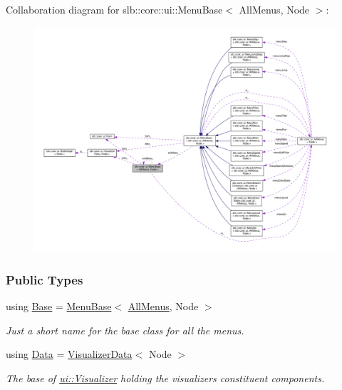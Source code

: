 Collaboration diagram for slb\+:\+:core\+:\+:ui\+:\+:Menu\+Base$<$ All\+Menus, Node $>$\+:\nopagebreak
\begin{figure}[H]
\begin{center}
\leavevmode
\includegraphics[width=350pt]{structslb_1_1core_1_1ui_1_1MenuBase__coll__graph}
\end{center}
\end{figure}
\subsubsection*{Public Types}
\begin{DoxyCompactItemize}
\item 
using \hyperlink{structslb_1_1core_1_1ui_1_1MenuBase_a766bcf66d6b83992085bad43a4455585}{Base} = \hyperlink{structslb_1_1core_1_1ui_1_1MenuBase}{Menu\+Base}$<$ \hyperlink{structslb_1_1core_1_1ui_1_1AllMenus}{All\+Menus}, Node $>$\hypertarget{structslb_1_1core_1_1ui_1_1MenuBase_a766bcf66d6b83992085bad43a4455585}{}\label{structslb_1_1core_1_1ui_1_1MenuBase_a766bcf66d6b83992085bad43a4455585}

\begin{DoxyCompactList}\small\item\em Just a short name for the base class for all the menus. \end{DoxyCompactList}\item 
using \hyperlink{structslb_1_1core_1_1ui_1_1MenuBase_a1803444111552d2e5b87671292dd74cb}{Data} = \hyperlink{structslb_1_1core_1_1ui_1_1VisualizerData}{Visualizer\+Data}$<$ Node $>$\hypertarget{structslb_1_1core_1_1ui_1_1MenuBase_a1803444111552d2e5b87671292dd74cb}{}\label{structslb_1_1core_1_1ui_1_1MenuBase_a1803444111552d2e5b87671292dd74cb}

\begin{DoxyCompactList}\small\item\em The base of \hyperlink{structslb_1_1core_1_1ui_1_1Visualizer}{ui\+::\+Visualizer} holding the visualizer\textquotesingle{}s constituent components. \end{DoxyCompactList}\end{DoxyCompactItemize}
